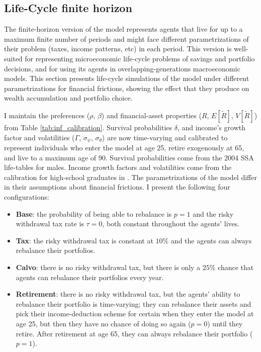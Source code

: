 \documentclass[./RiskyContrib.tex]{subfiles}
\begin{document}
\subsection{Life-Cycle finite horizon}

The finite-horizon version of the model represents agents that live for up to
a maximum finite number of periods and might face different parametrizations
of their problem (taxes, income patterns, etc) in each period. This version is
well-suited for representing microeconomic life-cycle problems of savings and
portfolio decisions, and for using its agents in overlapping-generations macroeconomic
models. This section presents life-cycle simulations of the model under different
parametrizations for financial frictions, showing the effect that they produce
on wealth accumulation and portfolio choice.

I maintain the preferences ($\rho$, $\beta$) and financial-asset properties
($R$, $E[\tilde{R}]$, $V[\tilde{R}]$) from Table \ref{tab:inf_calibration}.
Survival probabilities $\delta$, and income's growth factor and volatilities
($\Gamma$, $\sigma_{\psi}$, $\sigma_{\theta}$) are now time-varying and
calibrated to represent  individuals who enter the model at age 25,
retire exogenously at 65, and live to a maximum age of 90. Survival
probabilities come from the 2004 SSA life-tables for males. Income growth
factors and volatilities come from the calibration for high-school graduates
in \cite{Cagetti2003jbes}. The parametrizations of the model differ in their
assumptions about financial frictions. I present the following four configurations:
\begin{itemize}
\item \textbf{Base}: the probability of being able to rebalance is $p = 1$
and the risky withdrawal tax rate is $\tau = 0$, both constant throughout the agents' lives.
\item \textbf{Tax}: the risky withdrawal tax is constant at $10\%$ and the agents
can always rebalance their portfolios.
\item \textbf{Calvo}: there is no risky withdrawal tax, but there is only a $25\%$ chance
that agents can rebalance their portfolios every year.
\item \textbf{Retirement}: there is no risky withdrawal tax, but the agents' ability
to rebalance their portfolio is time-varying; they can rebalance their assets and pick
their income-deduction scheme for certain when they enter the model at age 25, but
then they have no chance of doing so again ($p=0$) until they retire. After retirement
at age 65, they can always rebalance their portfolio ($p=1$).
\end{itemize}
\end{document}
